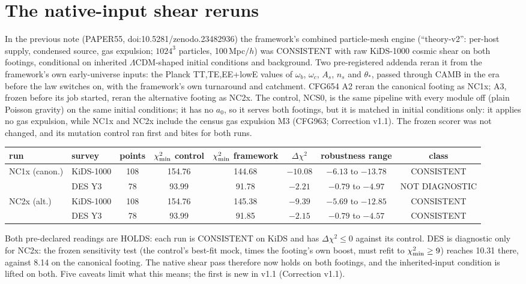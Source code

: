 \documentclass[10pt]{article}
\begin{document}
\section{The native-input shear reruns}
In the previous note (PAPER55, doi:10.5281/zenodo.23482936) the framework's combined particle-mesh engine (``theory-v2'': per-host supply, condensed source, gas expulsion; $1024^3$ particles, 100\,Mpc$/h$) was CONSISTENT with raw KiDS-1000 cosmic shear on both footings, conditional on inherited $\Lambda$CDM-shaped initial conditions and background. Two pre-registered addenda reran it from the framework's own early-universe inputs: the Planck TT,TE,EE+lowE values of $\omega_b$, $\omega_c$, $A_s$, $n_s$ and $\theta_*$, passed through CAMB in the era before the law switches on, with the framework's own turnaround and catchment. CFG654 A2 reran the canonical footing as NC1x; A3, frozen before its job started, reran the alternative footing as NC2x. The control, NCS0, is the same pipeline with every module off (plain Poisson gravity) on the same initial conditions; it has no $a_0$, so it serves both footings, but it is matched in initial conditions only: it applies no gas expulsion, while NC1x and NC2x include the census gas expulsion M3 (CFG963; Correction v1.1). The frozen scorer was not changed, and its mutation control ran first and bites for both runs.
\begin{center}\small\setlength{\tabcolsep}{3.5pt}
\begin{tabular}{llcccccc}
\toprule
run & survey & points & $\chi^2_{\rm min}$ control & $\chi^2_{\rm min}$ framework & $\Delta\chi^2$ & robustness range & class\\
\midrule
NC1x (canon.) & KiDS-1000 & 108 & 154.76 & 144.68 & $-10.08$ & $-6.13$ to $-13.78$ & CONSISTENT\\
 & DES Y3 & 78 & 93.99 & 91.78 & $-2.21$ & $-0.79$ to $-4.97$ & NOT DIAGNOSTIC\\
NC2x (alt.) & KiDS-1000 & 108 & 154.76 & 145.38 & $-9.39$ & $-5.69$ to $-12.85$ & CONSISTENT\\
 & DES Y3 & 78 & 93.99 & 91.85 & $-2.15$ & $-0.79$ to $-4.57$ & CONSISTENT\\
\bottomrule
\end{tabular}
\end{center}
Both pre-declared readings are HOLDS: each run is CONSISTENT on KiDS and has $\Delta\chi^2\le0$ against its control. DES is diagnostic only for NC2x: the frozen sensitivity test (the control's best-fit mock, times the footing's own boost, must refit to $\chi^2_{\rm min}\ge9$) reaches 10.31 there, against 8.14 on the canonical footing. The native shear pass therefore now holds on both footings, and the inherited-input condition is lifted on both. Five caveats limit what this means; the first is new in v1.1 (Correction v1.1).
\end{document}
